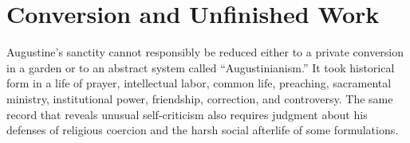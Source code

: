 \section{Conversion and Unfinished Work}

Augustine's sanctity cannot responsibly be reduced either to a private
conversion in a garden or to an abstract system called “Augustinianism.” It
took historical form in a life of prayer, intellectual labor, common life,
preaching, sacramental ministry, institutional power, friendship, correction,
and controversy. The same record that reveals unusual self-criticism also
requires judgment about his defenses of religious coercion and the harsh
social afterlife of some formulations.
